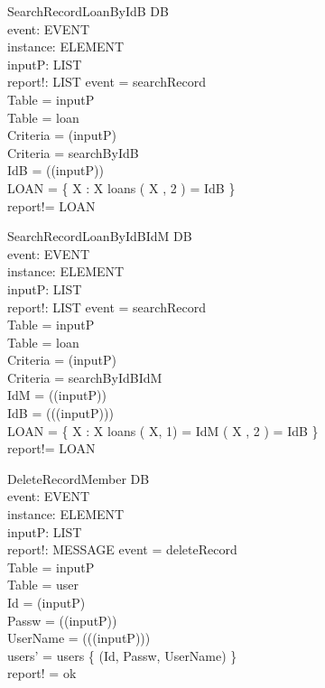 \begin{schema}{SearchRecordLoanByIdB}
\Delta DB \\
event: EVENT \\
instance: ELEMENT \\
inputP: LIST \\
report!: LIST
\where event = searchRecord \\
Table = \head inputP \\
Table = loan \\
Criteria = \head (\tail inputP) \\
Criteria = searchByIdB \\
IdB = \head (\tail (\tail inputP)) \\
LOAN = \{ X : \nat \bbar X \mem loans \land \nth( X , 2 ) = IdB \} \\
report!= LOAN
\end{schema}

\begin{schema}{SearchRecordLoanByIdBIdM}
\Delta DB \\
event: EVENT \\
instance: ELEMENT \\
inputP: LIST \\
report!: LIST
\where event = searchRecord \\
Table = \head inputP \\
Table = loan \\
Criteria = \head (\tail inputP) \\
Criteria = searchByIdBIdM \\
IdM = \head (\tail (\tail inputP)) \\
IdB = \head (\tail (\tail (\tail inputP))) \\
LOAN = \{ X : \nat \bbar X \mem loans \land \nth( X, 1) = IdM \land \nth( X , 2 ) = IdB \} \\
report!= LOAN
\end{schema}

\begin{schema}{DeleteRecordMember}
\Delta DB \\
event: EVENT \\
instance: ELEMENT \\
inputP: LIST \\
report!: MESSAGE
\where event = deleteRecord \\
Table = \head inputP \\
Table = user \\
Id = \head (\tail inputP) \\
Passw = \head (\tail (\tail inputP)) \\
UserName = \head (\tail (\tail (\tail inputP))) \\
users' = users \setminus \{ (Id, Passw, UserName) \} \\
report! = ok 
\end{schema}

